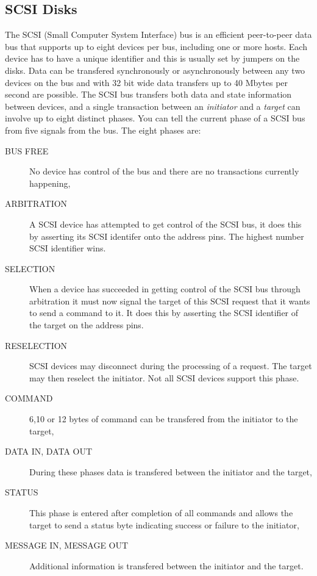 \subsection{SCSI Disks}
The SCSI (Small Computer System Interface) bus is an efficient peer-to-peer
data bus that supports up to eight devices per bus, including one or more 
hosts.
Each device has to have a unique identifier and this is usually set by 
jumpers on the disks.
Data can be transfered synchronously or asynchronously between any two 
devices on the bus and with 32 bit wide data transfers up to 40 Mbytes per
second are possible.
The SCSI bus transfers both data and state information between devices, and
a single transaction between an {\em initiator} and a {\em target} can
involve up to eight distinct phases.
You can tell the current phase of a SCSI bus from five signals from the
bus.
The eight phases are:
\begin{description}
	\item [BUS FREE]  No device has control of the bus and there are
		no transactions currently happening,
	\item [ARBITRATION] A SCSI device has attempted to get control of 
		the SCSI bus, it does this by asserting its SCSI identifer
		onto the address pins.  The highest number SCSI identifier
		wins.   
	\item [SELECTION] When a device has succeeded in getting control of
		the SCSI bus through arbitration it must now signal the target
		of this SCSI request that it wants to send a command to it.
		It does this by asserting the SCSI identifier of the target
		on the address pins.
	\item [RESELECTION] SCSI devices may disconnect during the processing
		of a request.  The target may then reselect the initiator.
		Not all SCSI devices support this phase.
	\item [COMMAND] 6,10 or 12 bytes of command can be transfered from
		the initiator to the target, 
	\item [DATA IN, DATA OUT] During these phases data is transfered
		between the initiator and the target,
	\item [STATUS] This phase is entered after completion of all commands
		and allows the target to send a status byte indicating
		success or failure to the initiator,
	\item [MESSAGE IN, MESSAGE OUT] Additional information is transfered
		between the initiator and the target.
\end{description}
